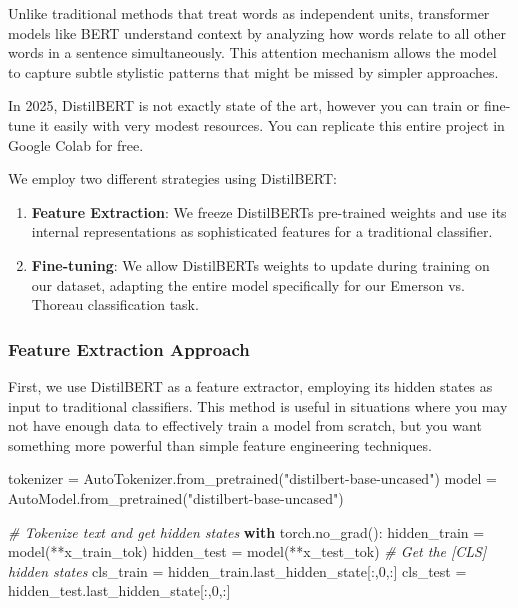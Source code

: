 \documentclass[
]{article}
\newenvironment{Shaded}{}{}
\newcommand{\CommentTok}[1]{\textcolor[rgb]{0.38,0.63,0.69}{\textit{#1}}}
\newcommand{\ControlFlowTok}[1]{\textcolor[rgb]{0.00,0.44,0.13}{\textbf{#1}}}
\newcommand{\DecValTok}[1]{\textcolor[rgb]{0.25,0.63,0.44}{#1}}
\newcommand{\NormalTok}[1]{#1}
\newcommand{\OperatorTok}[1]{\textcolor[rgb]{0.40,0.40,0.40}{#1}}
\newcommand{\StringTok}[1]{\textcolor[rgb]{0.25,0.44,0.63}{#1}}
\begin{document}
Unlike traditional methods that treat words as independent units,
transformer models like BERT understand context by analyzing how words
relate to all other words in a sentence simultaneously. This
\textquotesingle attention mechanism\textquotesingle{} allows the model
to capture subtle stylistic patterns that might be missed by simpler
approaches.

In 2025, DistilBERT is not exactly state of the art, however you can
train or fine-tune it easily with very modest resources. You can replicate this entire project in Google Colab for free.

We employ two different strategies using DistilBERT:

\begin{enumerate}
\def\labelenumi{\arabic{enumi}.}
\item
  \textbf{Feature Extraction}: We freeze DistilBERT\textquotesingle s
  pre-trained weights and use its internal representations as
  sophisticated features for a traditional classifier.
\item
  \textbf{Fine-tuning}: We allow DistilBERT\textquotesingle s weights to
  update during training on our dataset, adapting the entire model
  specifically for our Emerson vs. Thoreau classification task.
\end{enumerate}

\subsubsection{Feature Extraction
Approach}\label{feature-extraction-approach}

First, we use DistilBERT as a feature extractor, employing its hidden
states as input to traditional classifiers. This method is useful in
situations where you may not have enough data to effectively train a
model from scratch, but you want something more powerful than simple
feature engineering techniques.

\begin{Shaded}
\begin{Highlighting}[]
\NormalTok{tokenizer }\OperatorTok{=}\NormalTok{ AutoTokenizer.from\_pretrained(}\StringTok{"distilbert{-}base{-}uncased"}\NormalTok{)}
\NormalTok{model }\OperatorTok{=}\NormalTok{ AutoModel.from\_pretrained(}\StringTok{"distilbert{-}base{-}uncased"}\NormalTok{)}

\CommentTok{\# Tokenize text and get hidden states}
\ControlFlowTok{with}\NormalTok{ torch.no\_grad():}
\NormalTok{    hidden\_train }\OperatorTok{=}\NormalTok{ model(}\OperatorTok{**}\NormalTok{x\_train\_tok)}
\NormalTok{    hidden\_test }\OperatorTok{=}\NormalTok{ model(}\OperatorTok{**}\NormalTok{x\_test\_tok)}
    \CommentTok{\# Get the [CLS] hidden states}
\NormalTok{    cls\_train }\OperatorTok{=}\NormalTok{ hidden\_train.last\_hidden\_state[:,}\DecValTok{0}\NormalTok{,:]}
\NormalTok{    cls\_test }\OperatorTok{=}\NormalTok{ hidden\_test.last\_hidden\_state[:,}\DecValTok{0}\NormalTok{,:]}
\end{Highlighting}
\end{Shaded}
\end{document}
